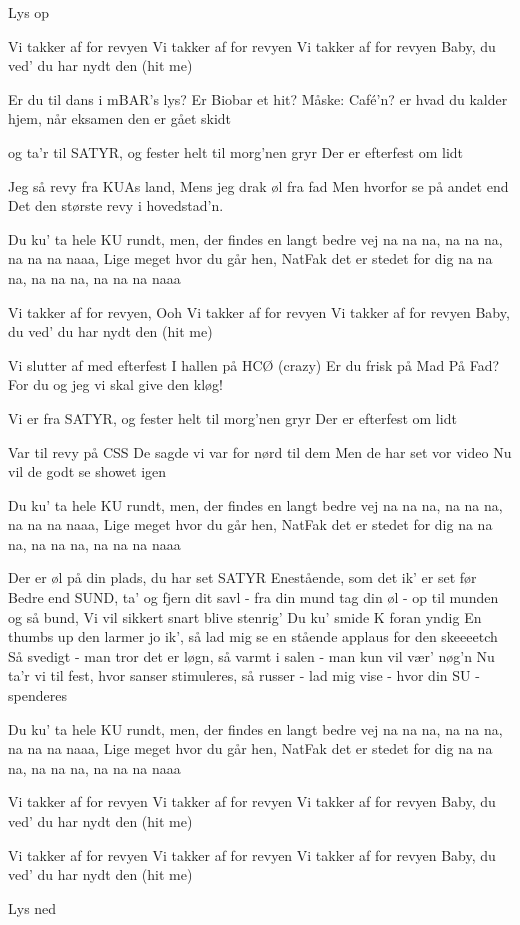 \documentclass[a4paper,11pt]{article}
\begin{document}
\begin{song}
\scene Lys op

 Vi takker af for revyen
Vi takker af for revyen
Vi takker af for revyen
Baby, du ved' du har nydt den (hit me)

 Er du til dans i mBAR’s lys?
Er Biobar et hit?
Måske: Café'n? er hvad du kalder hjem, når eksamen den er gået skidt

 og ta'r til SATYR, og fester helt til morg'nen gryr
Der er efterfest om lidt

 Jeg så revy fra KUAs land,
Mens jeg drak øl fra fad
Men hvorfor se på andet end
Det den største revy i hovedstad'n.

 Du ku’ ta hele KU rundt, men, der findes en langt bedre vej
na na na, na na na, na na na naaa,
Lige meget hvor du går hen, NatFak det er stedet for dig
na na na, na na na, na na na naaa

 Vi takker af for revyen, Ooh
Vi takker af for revyen
Vi takker af for revyen
Baby, du ved' du har nydt den (hit me)

 Vi slutter af med efterfest
I hallen på HCØ (crazy)
Er du frisk på Mad På Fad? For du og jeg vi skal give den kløg!

 Vi er fra SATYR, og fester helt til morg'nen gryr
Der er efterfest om lidt

 Var til revy på CSS
De sagde vi var for nørd til dem
Men de har set vor video
Nu vil de godt se showet igen

 Du ku’ ta hele KU rundt, men, der findes en langt bedre vej
na na na, na na na, na na na naaa,
Lige meget hvor du går hen, NatFak det er stedet for dig
na na na, na na na, na na na naaa

 Der er øl på din plads, du har set SATYR
Enestående, som det ik' er set før
Bedre end SUND, ta' og fjern dit savl - fra din mund
tag din øl - op til munden og så bund,
Vi vil sikkert snart blive stenrig'
Du ku’ smide K foran yndig
En thumbs up den larmer jo ik’, så lad mig se en stående applaus for den skeeeetch
Så svedigt - man tror det er løgn, så varmt i salen - man kun vil vær' nøg'n
Nu ta'r vi til fest, hvor sanser stimuleres,
så russer - lad mig vise - hvor din SU - spenderes

 Du ku’ ta hele KU rundt, men, der findes en langt bedre vej
na na na, na na na, na na na naaa,
Lige meget hvor du går hen, NatFak det er stedet for dig
na na na, na na na, na na na naaa

 Vi takker af for revyen
Vi takker af for revyen
Vi takker af for revyen
Baby, du ved' du har nydt den (hit me)

 Vi takker af for revyen
Vi takker af for revyen
Vi takker af for revyen
Baby, du ved' du har nydt den (hit me)

\scene Lys ned
\end{song}
\end{document}
